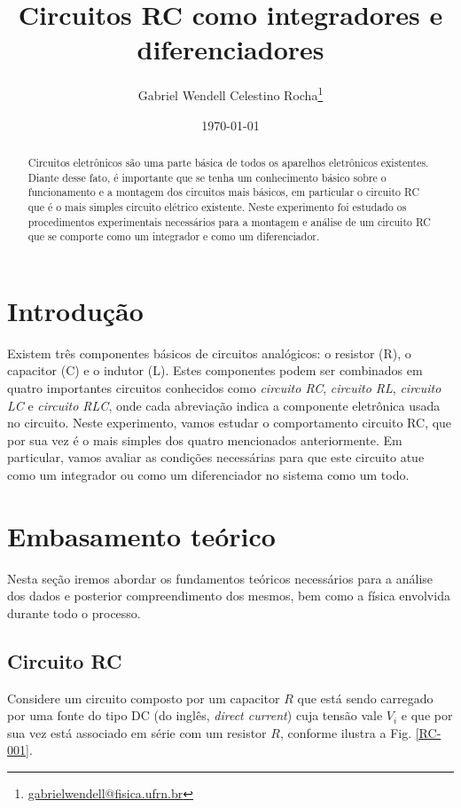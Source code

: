 \documentclass[letterpaper, 12pt]{article}
\begin{document}
\title{\bf Circuitos RC como integradores e diferenciadores}
\author{Gabriel Wendell Celestino Rocha\footnote{\href{mailto:gabrielwendell@fisica.ufrn.br}{gabrielwendell@fisica.ufrn.br}}}
\date{\today}
\maketitle

\begin{abstract}
Circuitos eletrônicos são uma parte básica de todos os aparelhos eletrônicos existentes. Diante desse fato, é importante que se tenha um conhecimento básico sobre o funcionamento e a montagem dos circuitos mais básicos, em particular o circuito RC que é o mais simples circuito elétrico existente. Neste experimento foi estudado os procedimentos experimentais necessários para a montagem e análise de um circuito RC que se comporte como um integrador e como um diferenciador.
\end{abstract}


\section{Introdução}
Existem três componentes básicos de circuitos analógicos: o resistor (R), o capacitor (C) e o indutor (L). Estes componentes podem ser combinados em quatro importantes circuitos conhecidos como {\it circuito RC}, {\it circuito RL}, {\it circuito LC} e {\it circuito RLC}, onde cada abreviação indica a componente eletrônica usada no circuito. Neste experimento, vamos estudar o comportamento circuito RC, que por sua vez é o mais simples dos quatro mencionados anteriormente. Em particular, vamos avaliar as condições necessárias para que este circuito atue como um integrador ou como um diferenciador no sistema como um todo.


\section{Embasamento teórico}\label{Sec 2}
Nesta seção iremos abordar os fundamentos teóricos necessários para a análise dos dados e posterior compreendimento dos mesmos, bem como a física envolvida durante todo o processo. 

\subsection{Circuito RC}
Considere um circuito composto por um capacitor $R$ que está sendo carregado por uma fonte do tipo DC (do inglês, {\it direct current}) cuja tensão vale $V_{i}$ e que por sua vez está associado em série com um resistor $R$, conforme ilustra a Fig. \ref{RC-001}. 
\end{document}
